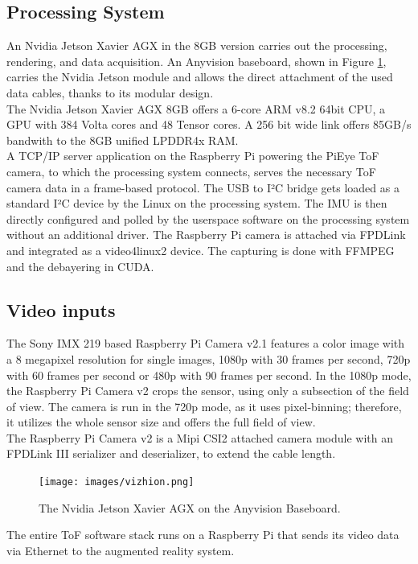 \subsection{Processing System}
\label{sec:procSystem}
An Nvidia Jetson Xavier AGX in the 8GB version carries out the processing, rendering, and data acquisition. An Anyvision baseboard, shown in Figure \ref{fig:anyvision}, carries the Nvidia Jetson module and allows the direct attachment of the used data cables, thanks to its modular design.\cite{groo:Thesis:2020}\\
The Nvidia Jetson Xavier AGX 8GB offers a 6-core ARM v8.2 64bit CPU, a GPU with 384 Volta cores and 48 Tensor cores. A 256 bit wide link offers 85GB/s bandwith to the 8GB unified LPDDR4x RAM.\\
A TCP/IP server application on the Raspberry Pi powering the PiEye ToF camera, to which the processing system connects, serves the necessary ToF camera data in a frame-based protocol. The USB to I²C bridge gets loaded as a standard I²C device by the Linux on the processing system. The IMU is then directly configured and polled by the userspace software on the processing system without an additional driver. The Raspberry Pi camera is attached via FPDLink and integrated as a video4linux2 device. The capturing is done with FFMPEG and the debayering in CUDA.\cite{iszt:BA:2021}
\subsection{Video inputs}
\label{sec:videoInputs}
The Sony IMX 219 based Raspberry Pi Camera v2.1 features a color image with a 8 megapixel resolution for single images, 1080p with 30 frames per second, 720p with 60 frames per second or 480p with 90 frames per second.\cite{raspiCamSpec} In the 1080p mode, the Raspberry Pi Camera v2 crops the sensor, using only a subsection of the field of view. The camera is run in the 720p mode, as it uses pixel-binning; therefore, it utilizes the whole sensor size and offers the full field of view.\\
The Raspberry Pi Camera v2 is a Mipi CSI2 attached camera module with an FPDLink III serializer and deserializer, to extend the cable length.
\begin{figure}[H]
    \centering
    \texttt{[image: images/vizhion.png]}
    \caption{The Nvidia Jetson Xavier AGX on the Anyvision Baseboard.}
    \label{fig:anyvision}
\end{figure}
 The entire ToF software stack runs on a Raspberry Pi that sends its video data via Ethernet to the augmented reality system.
